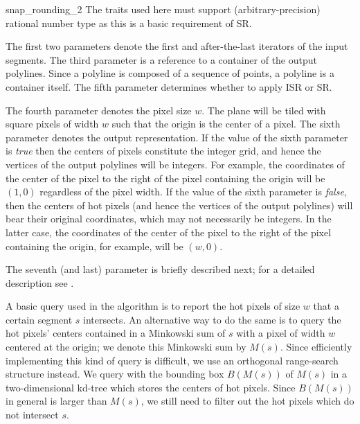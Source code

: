 \begin{ccRefFunction}{snap_rounding_2}
The traits used here must support (arbitrary-precision) rational number type as
this is a basic requirement of SR.



The first two parameters denote the first and after-the-last iterators
of the input segments.  The third parameter is a reference to a
container of the output polylines. Since a polyline is composed of a
sequence of points, a polyline is a container itself.  The fifth
parameter determines whether to apply ISR or SR.

The fourth parameter denotes the pixel size $w$. The plane will be
tiled with square pixels of width $w$ such that the origin is the
center of a pixel. The sixth parameter denotes the output
representation. If the value of the sixth parameter is {\it true\/}
then the centers of pixels constitute the integer grid, and hence the
vertices of the output polylines will be integers. For example, the
coordinates of the center of the pixel to the right of the pixel
containing the origin will be $(1,0)$ regardless of the pixel width.
If the value of the sixth parameter is {\it false\/}, then the centers
of hot pixels (and hence the vertices of the output polylines) will
bear their original coordinates, which may not necessarily be
integers. In the latter case, the coordinates of the center of the
pixel to the right of the pixel containing the origin, for example,
will be $(w,0)$.

The seventh (and last) parameter is briefly described next; for a
detailed description see \cite{cgal:hp-isr-02}.

\begin{ccAdvanced}

 A basic query used in the algorithm is to report the hot pixels of
 size $w$ that a certain segment $s$ intersects.  An alternative way to
 do the same is to query the hot pixels' centers contained in a
 Minkowski sum of $s$ with a pixel of width $w$ centered at the origin;
 we denote this Minkowski sum by $M(s)$. Since efficiently implementing
 this kind of query is difficult, we use an orthogonal range-search
 structure instead. We query with the bounding box $B(M(s))$ of $M(s)$
 in a two-dimensional kd-tree which stores the centers of hot
 pixels. Since $B(M(s))$ in general is larger than $M(s)$, we still
 need to filter out the hot pixels which do not intersect $s$.


\end{ccAdvanced}
\end{ccRefFunction}
